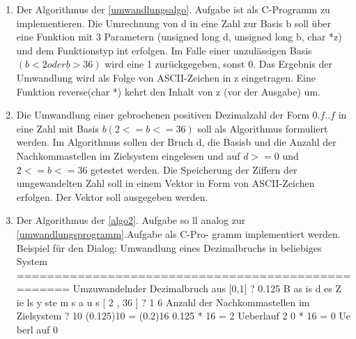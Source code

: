 \documentclass[12pt,a4paper]{scrreprt}
\begin{document}
\begin{enumerate}
\item\label{umwandlungsprogramm} %
Der Algorithmus der \ref{umwandlungsalgo}. Aufgabe ist als C-Programm zu implementieren. Die Umrechnung von d in eine Zahl zur Basis b soll über eine Funktion mit 3 Parametern (unsigned long d, unsigned long b, char *z) und dem Funktionstyp int erfolgen. Im Falle einer unzulässigen Basis $(b<2 oder b>36)$ wird eine 1 zurückgegeben, sonst 0. Das Ergebnis der Umwandlung wird als Folge von ASCII-Zeichen in z eingetragen. Eine Funktion
reverse(char *) kehrt den Inhalt von z (vor der Ausgabe) um.

\item\label{algo2} %
Die Umwandlung einer gebrochenen positiven Dezimalzahl der Form
$0.f..f$ in eine Zahl mit Basis $b (2 <= b <= 36)$ soll als Algorithmus
formuliert werden. Im Algorithmus sollen der Bruch d, die Basisb und
die Anzahl der Nachkommastellen im Zielsystem eingelesen und auf
$d >= 0$ und $2 <= b <= 36$ getestet werden. Die Speicherung der Ziffern
der umgewandelten Zahl soll in einem Vektor in Form von ASCII-Zeichen
erfolgen. Der Vektor soll ausgegeben werden.

\item %
Der Algorithmus der \ref{algo2}. Aufgabe so ll analog zur \ref{umwandlungsprogramm}.Aufgabe als C-Pro-
gramm implementiert werden. Beispiel für den Dialog:
Umwandlung eines Dezimalbruchs in beliebiges System
===================================================
Umzuwandelnder Dezimalbruch aus [0,1] ? 0.125
B as is d es Z ie ls y ste m s a u s [ 2 , 36 ] ? 1 6
Anzahl der Nachkommastellen im Zielsystem ? 10
(0.125)10 = (0.2)16
0.125 * 16 =
2 Ueberlauf 2
0 * 16 =
0 Ue berl auf 0

\end{enumerate}
\end{document}
